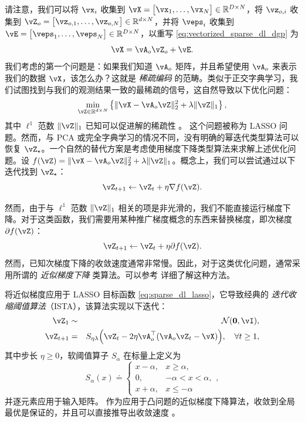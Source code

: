 \documentclass[../../book-main_zh.tex]{subfiles}
\begin{document}
请注意，我们可以将 \(\vx_{i}\) 收集到 \(\vX = \mat{\vx_{1}, \dots, \vx_{N}} \in \R^{D \times N}\)，将 \(\vz_{o, i}\) 收集到 \(\vZ_{o} = \mat{\vz_{o, 1}, \dots, \vz_{o, N}} \in \R^{d  \times N}\)，并将 \(\veps_{i}\) 收集到 \(\vE = \mat{\veps_{1}, \dots, \veps_{N}} \in \R^{D \times N}\)，以重写 \eqref{eq:vectorized_sparse_dl_dgp} 为
\begin{equation}\label{eq:sparse_dl_dgp}
    \vX = \vA_{o}\vZ_{o} + \vE.
\end{equation}
我们考虑的第一个问题是：如果我们知道 \(\vA_{o}\) 矩阵，并且希望使用 \(\vA_{o}\) 来表示我们的数据 \(\vX\)，该怎么办？这就是 \textit{稀疏编码} 的范畴。类似于正交字典学习，我们试图找到与我们的观测结果一致的最稀疏的信号，这自然导致以下优化问题：
\begin{equation}\label{eq:sparse_dl_lasso}
    \min_{\vZ \in \R^{d \times N}}\bc{\norm{\vX - \vA_{o}\vZ}_{2}^{2} + \lambda \norm{\vZ}_{1}},
\end{equation}
其中 \(\ell^1\) 范数 \(\norm{\vZ}_{1}\) 已知可以促进解的稀疏性 \cite{Wright-Ma-2022}。
这个问题被称为 LASSO 问题。然而，与 PCA 或完全字典学习的情况不同，没有明确的幂迭代类型算法可以恢复 \(\vZ_{\star}\)。一个自然的替代方案是考虑使用梯度下降类型算法来求解上述优化问题。设 \(f(\vZ) = \norm{\vX - \vA_{o}\vZ}_{2}^{2} + \lambda \norm{\vZ}_{1}\)。概念上，我们可以尝试通过以下迭代找到 \(\vZ_{\star}\)：
\begin{equation}
    \vZ_{t+1} \leftarrow \vZ_t + \eta \nabla f(\vZ).
\end{equation}

然而，由于与 \(\ell^1\) 范数 \(\norm{\vZ}_{1}\) 相关的项是非光滑的，我们不能直接运行梯度下降。对于这类函数，我们需要用某种推广梯度概念的东西来替换梯度，即次梯度 \(\partial f(\vZ)\)：
\begin{equation}
    \vZ_{t+1} \leftarrow \vZ_t + \eta \partial f(\vZ).
\end{equation}
然而，已知次梯度下降的收敛速度通常非常慢。因此，对于这类优化问题，通常采用所谓的 {\em 近似梯度下降} 类算法。可以参考 \cite{Wright-Ma-2022} 详细了解这种方法。

将近似梯度应用于 LASSO 目标函数 \eqref{eq:sparse_dl_lasso}，它导致经典的 \textit{迭代收缩阈值算法}（ISTA），该算法实现以下迭代：
\begin{eqnarray}
    \vZ_{1} &\sim& \dNorm(\vzero, \vI), \\
    \vZ_{t + 1} &=& S_{\eta\lambda}\rp{\vZ_{t} - 2\eta \vA_{o}^{\top}(\vA_{o}\vZ_{t} - \vX)}, \quad \forall t \geq 1,\label{eq:ista_update}
\end{eqnarray}
其中步长 \(\eta \geq 0\)，软阈值算子 \(S_{\alpha}\) 在标量上定义为
\begin{equation}
    S_{\alpha}(x) \doteq \begin{cases}x - \alpha, & x \geq \alpha, \\ 0, & -\alpha < x < \alpha, \\ x + \alpha, & x \leq -\alpha\end{cases},
\end{equation}
并逐元素应用于输入矩阵。 作为应用于凸问题的近似梯度下降算法，收敛到全局最优是保证的，并且可以直接推导出收敛速度 \cite{Wright-Ma-2022}。
\end{document}
